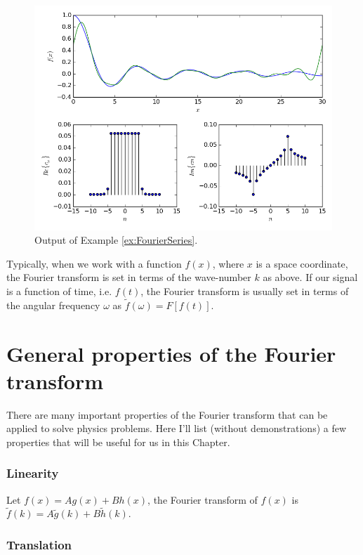 \begin{figure}[ht!]
 \centering
 \includegraphics[width=14cm,keepaspectratio=true]{./FourierSeries.png}
 \caption{Output of Example \ref{ex:FourierSeries}.}
 \label{fig:FourierSeries}
\end{figure}

Typically, when we work with a function $f(x)$, where $x$ is a space coordinate, the Fourier transform is set in terms of the wave-number $k$ as above. If our signal is a function of time, i.e. $f(t)$, the Fourier transform is usually set in terms of the angular frequency $\omega$ as $\tilde{f}(\omega) = F[f(t)]$. 

\section{General properties of the Fourier transform}

There are many important properties of the Fourier transform that can be applied to solve physics problems. Here I'll list (without demonstrations) a few properties that will be useful for us in this Chapter. 

\subsubsection*{Linearity}

Let $f(x) = A g(x) + B h(x)$, the Fourier transform of $f(x)$ is $\tilde{f}(k) = A \tilde{g}(k) + B \tilde{h}(k)$.

\subsubsection*{Translation}

